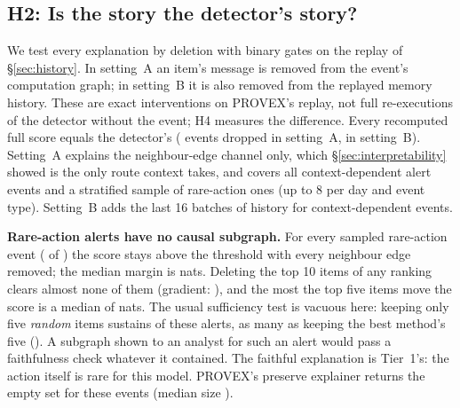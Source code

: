 \documentclass[conference]{IEEEtran}
\begin{document}
\subsection{H2: Is the story the detector's story?}
We test every explanation by deletion with binary gates on the replay of \S\ref{sec:history}. In setting~A
an item's message is removed from the event's computation graph; in setting~B it is also removed from the
replayed memory history. These are exact interventions on PROVEX's replay, not full re-executions of the
detector without the event; H4 measures the difference. Every recomputed full score equals the
detector's (\HADropped{} events dropped in setting~A, \HBDropped{} in setting~B). Setting~A explains the
neighbour-edge channel only, which \S\ref{sec:interpretability} showed is the only route context takes,
and covers all \HAWinN{} context-dependent alert events and a stratified sample of \HAPriorN{}
rare-action ones (up to 8 per day and event type). Setting~B adds the last 16 batches of history for
\HBWinN{} context-dependent events.

\textbf{Rare-action alerts have no causal subgraph.} For every sampled rare-action event
(\HAPriorFloorAlerts{} of \HAPriorN{}) the score stays above the threshold with every neighbour edge
removed; the median margin is \HAPriorMargin{} nats. Deleting the top 10 items of any ranking clears
almost none of them (gradient: \HAPriorGradientFlipTen{}), and the most the top five items move the score
is a median of \HAPriorGradientDLFive{} nats. The usual sufficiency test is vacuous here: keeping only five
\emph{random} items sustains \HAPriorRandomKeepFive{} of these alerts, as many as keeping the best
method's five (\HAPriorGradientKeepFive{}). A subgraph shown to an analyst for such an alert would pass a
faithfulness check whatever it contained. The faithful explanation is Tier~1's: the action itself is rare
for this model. PROVEX's preserve explainer returns the empty set for these events (median size
\HAPriorJointOwnSize{}).
\end{document}
